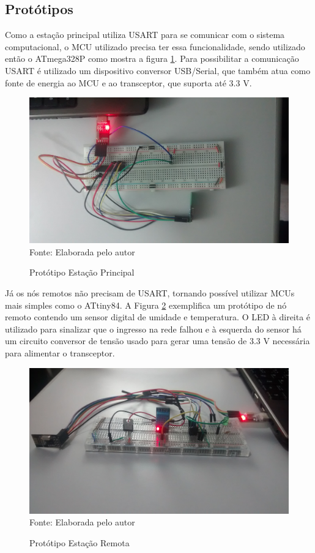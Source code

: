 {\subsection{Protótipos}
Como a estação principal utiliza USART para se comunicar com o sistema computacional, o MCU utilizado
precisa ter essa funcionalidade, sendo utilizado então o ATmega328P como mostra a figura
\ref{figura:prot_main}. Para possibilitar a comunicação USART é utilizado um dispositivo conversor USB/Serial,
que também atua como fonte de energia ao MCU e ao transceptor, que suporta até 3.3 V.

\begin{figure}[h!]
	\caption{Protótipo Estação Principal}
	\centering
	\includegraphics[scale=0.1]{../images/prot_principal.jpg}
	\hspace{\linewidth}
	Fonte: Elaborada pelo autor
	\label{figura:prot_main}
\end{figure}

Já os nós remotos não precisam de USART, tornando possível utilizar MCUs mais simples como o ATtiny84. A
Figura \ref{figura:prot_remote} exemplifica um protótipo de nó remoto contendo um sensor digital de umidade e
temperatura. O LED à direita é utilizado para sinalizar que o ingresso na rede falhou e à esquerda do sensor
há um circuito conversor de tensão usado para gerar uma tensão de 3.3 V necessária para alimentar o transceptor.

\begin{figure}[h!]
	\caption{Protótipo Estação Remota}
	\centering
	\includegraphics[scale=0.1]{../images/prot_remoto.jpg}
	\hspace{\linewidth}
	Fonte: Elaborada pelo autor
	\label{figura:prot_remote}
\end{figure}

}
